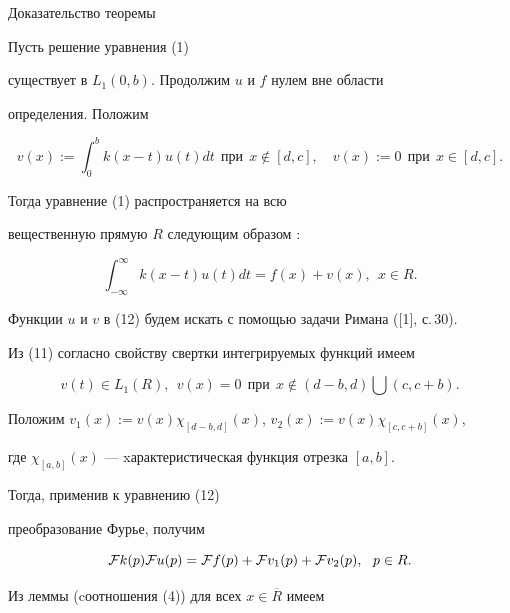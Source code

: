 \begin{pf*}{Доказательство теоремы}


Пусть решение уравнения (1)


существует в $L_1(0,b)$. Продолжим $u$ и $f$ нулем вне области


определения. Положим


\begin{equation}


v(x):= \int_0^b k(x-t)u(t)dt\ \ \text{при}\ \ x\notin[d,c],


\quad v(x):=0\ \ \text{при}\ \ x\in [d,c].


\end{equation}


Тогда уравнение (1) распространяется на всю


вещественную прямую $R$ следующим образом :


\begin{equation}


\int_{-\infty}^\infty k(x-t)u(t)dt=f(x)+v(x),\ \ x\in R.


\end{equation}


Функции $u$ и $v$ в (12) будем искать с помощью задачи Римана ([1], с.\,30).





Из (11) согласно свойству свертки интегрируемых функций имеем


$$


v(t)\in L_1(R ),\ \ v(x)=0\ \ \text{при}


\ \ x\notin(d-b,d)\bigcup (c,c+b).


$$


Положим $v_1(x):=v(x)\chi_{[d-b,d]}(x)$, $v_2(x):=v(x)\chi_{[c,c+b]}(x)$,


где $\chi_{[a,b]}(x)$ --- xарактеристическая функция отрезка $[a,b]$.


Тогда, применив к уравнению (12)


преобразование Фурье, получим


$$


{\cal F}k(p){\cal F}u(p)= {\cal F}f(p)+


{\cal F}v_1(p) +{\cal F}v_2(p),\ \ p\in R.


$$





Из леммы (cоотношения (4)) для всех $x\in \overline{R}$ имеем


\begin{equation}



\end{equation}
\end{pf*}
